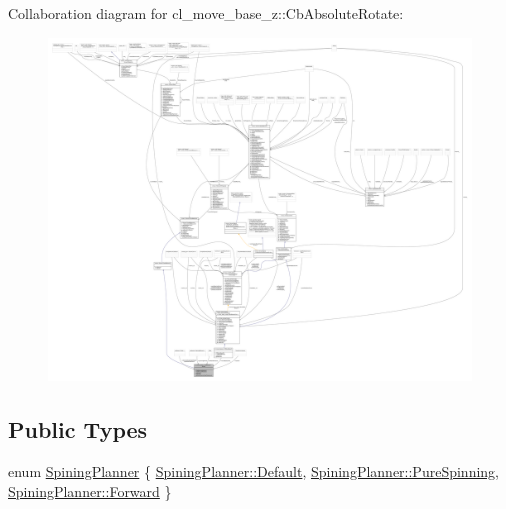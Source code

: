 Collaboration diagram for cl\+\_\+move\+\_\+base\+\_\+z\+:\+:Cb\+Absolute\+Rotate\+:
\nopagebreak
\begin{figure}[H]
\begin{center}
\leavevmode
\includegraphics[width=350pt]{classcl__move__base__z_1_1CbAbsoluteRotate__coll__graph}
\end{center}
\end{figure}
\subsection*{Public Types}
\begin{DoxyCompactItemize}
\item 
enum \hyperlink{classcl__move__base__z_1_1CbAbsoluteRotate_ab8d45e43594a3fc6a71c08f07b5dbef0}{Spining\+Planner} \{ \hyperlink{classcl__move__base__z_1_1CbAbsoluteRotate_ab8d45e43594a3fc6a71c08f07b5dbef0a7a1920d61156abc05a60135aefe8bc67}{Spining\+Planner\+::\+Default}, 
\hyperlink{classcl__move__base__z_1_1CbAbsoluteRotate_ab8d45e43594a3fc6a71c08f07b5dbef0aada5274435681a4ce04175bebfa6652f}{Spining\+Planner\+::\+Pure\+Spinning}, 
\hyperlink{classcl__move__base__z_1_1CbAbsoluteRotate_ab8d45e43594a3fc6a71c08f07b5dbef0a67d2f6740a8eaebf4d5c6f79be8da481}{Spining\+Planner\+::\+Forward}
 \}
\end{DoxyCompactItemize}
